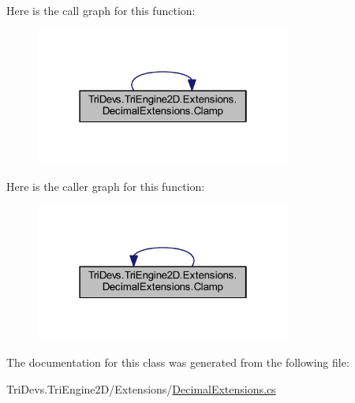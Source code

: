Here is the call graph for this function\-:
\nopagebreak
\begin{figure}[H]
\begin{center}
\leavevmode
\includegraphics[width=238pt]{class_tri_devs_1_1_tri_engine2_d_1_1_extensions_1_1_decimal_extensions_ac7f5febb4126439c95df66f88ba01a8b_cgraph}
\end{center}
\end{figure}




Here is the caller graph for this function\-:
\nopagebreak
\begin{figure}[H]
\begin{center}
\leavevmode
\includegraphics[width=238pt]{class_tri_devs_1_1_tri_engine2_d_1_1_extensions_1_1_decimal_extensions_ac7f5febb4126439c95df66f88ba01a8b_icgraph}
\end{center}
\end{figure}




The documentation for this class was generated from the following file\-:\begin{DoxyCompactItemize}
\item 
Tri\-Devs.\-Tri\-Engine2\-D/\-Extensions/\hyperlink{_decimal_extensions_8cs}{Decimal\-Extensions.\-cs}\end{DoxyCompactItemize}
